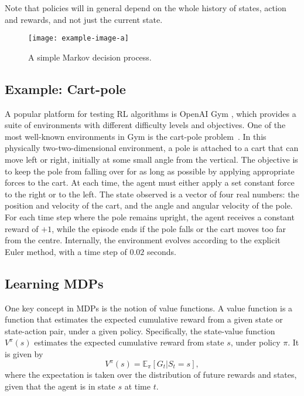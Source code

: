 Note that policies will in general depend on the whole history of states, action and rewards, and not just the current state.

\begin{figure}
    \centering
    \texttt{[image: example-image-a]}

    \caption{A simple Markov decision process.}
    \label{fig:mdp}
\end{figure}


\subsection{Example: Cart-pole}
A popular platform for testing RL algorithms is OpenAI Gym \autocite{gym}, which provides a suite of environments with different difficulty levels and objectives.
One of the most well-known environments in Gym is the cart-pole problem~\autocite{barto1983}.
In this physically two-two-dimensional environment, a pole is attached to a cart that can move left or right, initially at some small angle from the vertical.
The objective is to keep the pole from falling over for as long as possible by applying appropriate forces to the cart.
At each time, the agent must either apply a set constant force to the right or to the left.
The state observed is a vector of four real numbers: the position and velocity of the cart, and the angle and angular velocity of the pole.
For each time step where the pole remains upright, the agent receives a constant reward of $+1$, while the episode ends if the pole falls or the cart moves too far from the centre.
Internally, the environment evolves according to the explicit Euler method, with a time step of $0.02$ seconds\footnotemark.



\subsection{Learning MDPs}
One key concept in MDPs is the notion of value functions.
A value function is a function that estimates the expected cumulative reward from a given state or state-action pair, under a given policy.
Specifically, the state-value function $V^{\pi}(s)$ estimates the expected cumulative reward from state $s$, under policy $\pi$.
It is given by
\begin{equation}
    V^{\pi}(s) = \mathbb{E}_\pi \left[ G_t | S_t = s \right],
\end{equation}
where the expectation is taken over the distribution of future rewards and states, given that the agent is in state $s$ at time $t$.


